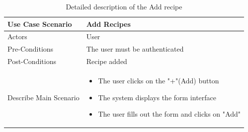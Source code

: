 \documentclass{article}
\begin{document}
{{\begin{table}[h]
    \centering
    \begin{tabularx}{\textwidth}{X|X}
        \toprule
        Use Case Scenario & Add Recipes \\
        \midrule
        Actors & User \\
        \midrule
        Pre-Conditions & The user must be authenticated \\
        \midrule
        Post-Conditions & Recipe added  \\
        \midrule
        Describe Main Scenario &  \begin{itemize}[label=$\bullet$]
            \item The user clicks on the "+"(Add) button
            \item The system displays the form interface
            \item The user fills out the form and clicks on "Add"
        \end{itemize} \\
        \bottomrule
    \end{tabularx}
    \caption{Detailed description of the Add recipe}
    \label{tab:actors_roles}
\end{table}



}}
\end{document}
